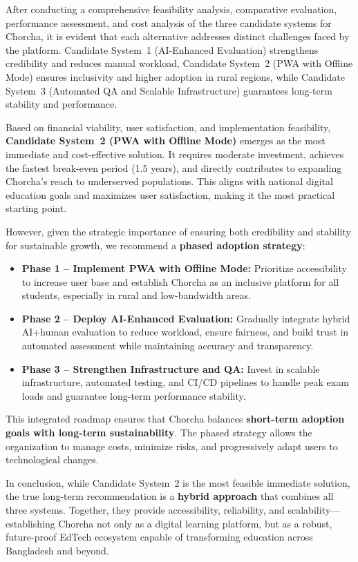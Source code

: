\documentclass[12pt,a4paper,oneside]{book}
\begin{document}
After conducting a comprehensive feasibility analysis, comparative evaluation, performance assessment, and cost analysis of the three candidate systems for Chorcha, it is evident that each alternative addresses distinct challenges faced by the platform. Candidate System~1 (AI-Enhanced Evaluation) strengthens credibility and reduces manual workload, Candidate System~2 (PWA with Offline Mode) ensures inclusivity and higher adoption in rural regions, while Candidate System~3 (Automated QA and Scalable Infrastructure) guarantees long-term stability and performance.

Based on financial viability, user satisfaction, and implementation feasibility, \textbf{Candidate System~2 (PWA with Offline Mode)} emerges as the most immediate and cost-effective solution. It requires moderate investment, achieves the fastest break-even period (1.5 years), and directly contributes to expanding Chorcha’s reach to underserved populations. This aligns with national digital education goals and maximizes user satisfaction, making it the most practical starting point.

However, given the strategic importance of ensuring both credibility and stability for sustainable growth, we recommend a \textbf{phased adoption strategy}:
\begin{itemize}
    \item \textbf{Phase 1 -- Implement PWA with Offline Mode:} Prioritize accessibility to increase user base and establish Chorcha as an inclusive platform for all students, especially in rural and low-bandwidth areas.
    \item \textbf{Phase 2 -- Deploy AI-Enhanced Evaluation:} Gradually integrate hybrid AI+human evaluation to reduce workload, ensure fairness, and build trust in automated assessment while maintaining accuracy and transparency.
    \item \textbf{Phase 3 -- Strengthen Infrastructure and QA:} Invest in scalable infrastructure, automated testing, and CI/CD pipelines to handle peak exam loads and guarantee long-term performance stability.
\end{itemize}

This integrated roadmap ensures that Chorcha balances \textbf{short-term adoption goals with long-term sustainability}. The phased strategy allows the organization to manage costs, minimize risks, and progressively adapt users to technological changes.

In conclusion, while Candidate System~2 is the most feasible immediate solution, the true long-term recommendation is a \textbf{hybrid approach} that combines all three systems. Together, they provide accessibility, reliability, and scalability---establishing Chorcha not only as a digital learning platform, but as a robust, future-proof EdTech ecosystem capable of transforming education across Bangladesh and beyond.
\end{document}
